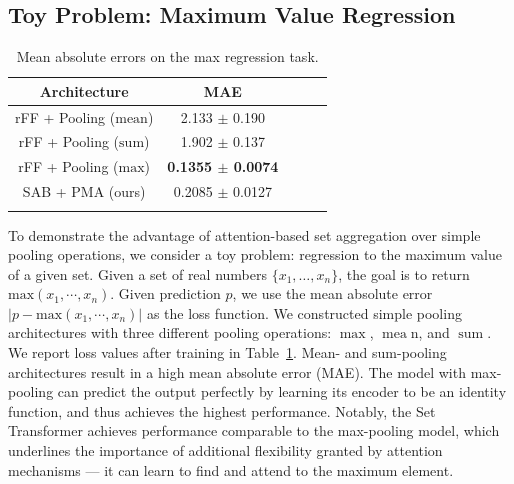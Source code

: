 \subsection{Toy Problem: Maximum Value Regression}
\begin{table}[t]
\centering
\small
\caption{Mean absolute errors on the max regression task.}
\vspace{5pt}
\begin{tabular}{@{}ccccc@{}}
\toprule
Architecture & MAE \\\midrule
rFF + Pooling ($\mathrm{mean}$) & 2.133 $\pm$ 0.190 \\
rFF + Pooling ($\mathrm{sum}$) & 1.902 $\pm$ 0.137 \\
rFF + Pooling ($\mathrm{max}$) & \bf 0.1355 $\pm$ 0.0074\\
\midrule
SAB + PMA (ours) & 0.2085 $\pm$ 0.0127\\
\bottomrule
\label{table:max}
\end{tabular}
\end{table}
\label{subsec:max_regression}
To demonstrate the advantage of attention-based set aggregation over simple pooling operations, we consider a toy problem: regression to the maximum value of a given set.
Given a set of real numbers $\{ x_1, \ldots, x_n\}$, the goal is to return $\mathrm{max}(x_1, \cdots, x_n)$.
Given prediction $p$, we use the mean absolute error $|p - \mathrm{max}(x_1, \cdots, x_n)|$ as the loss function. We constructed simple pooling architectures with three different pooling operations: $\operatorname{max}$, $\operatorname{mea}$n, and $\operatorname{sum}$. We report loss values after training in Table~\ref{table:max}.
Mean- and sum-pooling architectures result in a high mean absolute error (MAE).
The model with max-pooling can predict the output perfectly by learning its encoder to be an identity function, and thus achieves the highest performance.
Notably, the Set Transformer achieves performance comparable to the max-pooling model, which underlines the importance of additional flexibility granted by attention mechanisms --- it can learn to find and attend to the maximum element.

